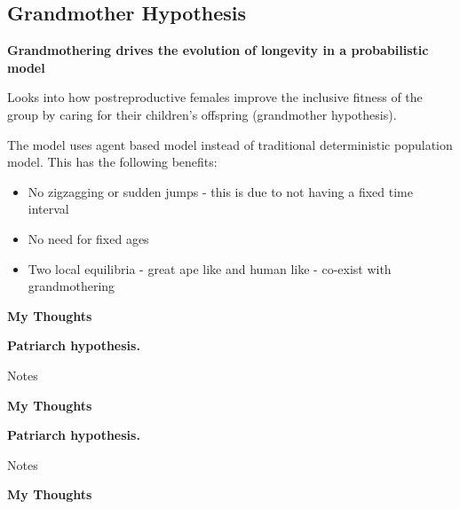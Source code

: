 \documentclass[authoryearcitations]{UoYCSproject}
\begin{document}
\subsection{Grandmother Hypothesis}
\begin{framed}
\noindent \textbf{Grandmothering drives the evolution of longevity in a probabilistic model \cite{grandmotheringProbabilistic2014}}

Looks into how postreproductive females improve the inclusive fitness of the group by caring for their children's offspring (grandmother hypothesis).

The model uses agent based model instead of traditional deterministic population model. This has the following benefits:
\begin{itemize}
    \item No zigzagging or sudden jumps - this is due to not having a fixed time interval
    \item No need for fixed ages
    \item Two local equilibria - great ape like and human like - co-exist with grandmothering
\end{itemize}

\noindent \textbf{My Thoughts}

\end{framed}

\begin{framed}
\noindent \textbf{Patriarch hypothesis. \cite{patriarchHypothesis2000}}

Notes

\noindent \textbf{My Thoughts}


\end{framed}

\begin{framed}
\noindent \textbf{Patriarch hypothesis. \cite{patriarchHypothesis2000}}

Notes

\noindent \textbf{My Thoughts}


\end{framed}
\end{document}
